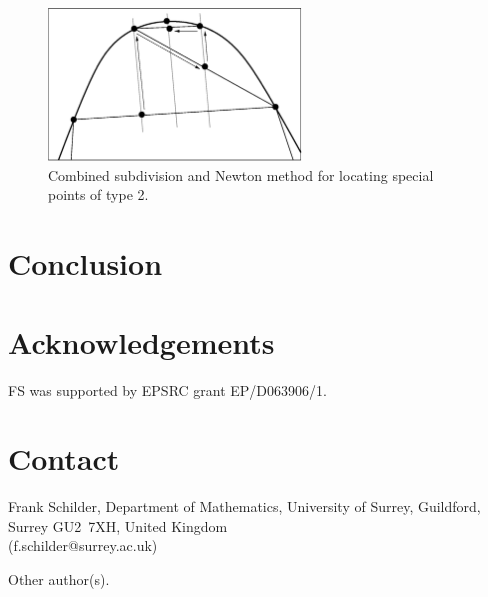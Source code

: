 \documentclass[twoside,draft,a4paper]{article}
\begin{document}
\begin{figure}
\centerline{\includegraphics[width=0.6\textwidth]{figs/bisec1.eps}}
\caption{Combined subdivision and Newton method for locating special points of type 2.}
\label{frank:fig1}
\end{figure}

\section{Conclusion}

\section{Acknowledgements}

FS was supported by EPSRC grant EP/D063906/1.

\section{Contact}

Frank Schilder, Department of Mathematics,
University of Surrey,
Guildford, Surrey \mbox{GU2 7XH},
United Kingdom \\
(f.schilder@surrey.ac.uk)

\vspace{2ex}\noindent Other author(s).


\appendix
\renewcommand{\theequation}{\Alph{section}.\arabic{equation}}




\end{document}
